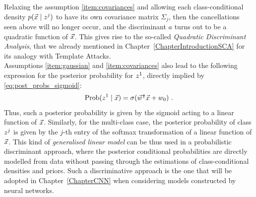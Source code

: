 Relaxing the assumption \ref{item:covariances} and allowing each class-conditional density $p(\vec{x}\mid z^j)$ to have its own covariance matrix $\Sigma_j$, then the cancellations seen above will no longer occur, and the discriminant $a$ turns out to be a quadratic function of $\vec{x}$. This gives rise to the so-called \emph{Quadratic Discriminant Analysis}, that we already mentioned in Chapter~\ref{ChapterIntroductionSCA} for its analogy with Template Attacks.\\

Assumptions \ref{item:gaussian} and \ref{item:covariances} also lead to the following expression for the posterior probability for $z^1$, directly implied by \eqref{eq:post_probs_sigmoid}: 
\begin{equation}\label{eq:binary_linear_classifier}
\prob(\given{\sensVar^1}{\vLeakVec}) = \sigma(\www^\intercal \vLeakVec + w_0)\mbox{ .}
\end{equation}
Thus, such a posterior probability is given by the sigmoid acting to a linear function of $\vec{x}$. Similarly, for the multi-class case, the posterior probability of class $z^j$ is given by the $j$-th entry of the softmax transformation of a linear function of $\vec{x}$. This kind of \emph{generalised linear model} can be thus used in a probabilistic discriminant approach, where the posterior conditional probabilities are directly modelled from data without passing through the estimations of class-conditional densities and priors. Such a discriminative approach is the one that will be adopted in Chapter~\ref{ChapterCNN} when considering models constructed by neural networks.




